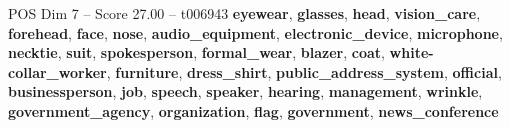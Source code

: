 \begin{textsample}{POS Dim 7 – Score 27.00 – t006943}  \label{ex:f7_pos_024}
\textbf{eyewear}, \textbf{glasses}, \textbf{head}, \textbf{vision\_care}, \textbf{forehead}, \textbf{face}, \textbf{nose}, \textbf{audio\_equipment}, \textbf{electronic\_device}, \textbf{microphone}, \textbf{necktie}, \textbf{suit}, \textbf{spokesperson}, \textbf{formal\_wear}, \textbf{blazer}, \textbf{coat}, \textbf{white-collar\_worker}, \textbf{furniture}, \textbf{dress\_shirt}, \textbf{public\_address\_system}, \textbf{official}, \textbf{businessperson}, \textbf{job}, \textbf{speech}, \textbf{speaker}, \textbf{hearing}, \textbf{management}, \textbf{wrinkle}, \textbf{government\_agency}, \textbf{organization}, \textbf{flag}, \textbf{government}, \textbf{news\_conference}

\end{textsample}
